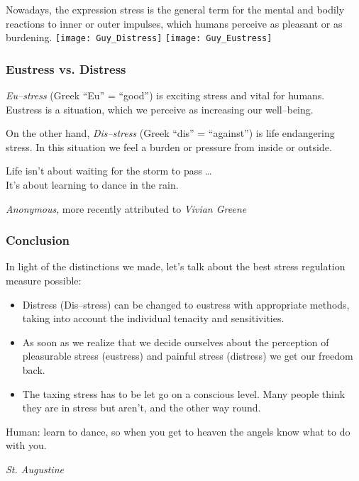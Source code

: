 \documentclass[../main.tex]{subfiles}
\begin{document}
Nowadays, the expression stress is the general term for the mental and bodily reactions to inner or outer impulses, which humans perceive as pleasant or as burdening.
\texttt{[image: Guy\_Distress]}
\hspace{5cm}
\texttt{[image: Guy\_Eustress]}

\subsubsection{Eustress vs. Distress}

\emph{Eu--stress} (Greek ``Eu'' = ``good'') is exciting stress and vital for humans. 
Eustress is a situation, which we perceive as increasing our well--being. 

On the other hand, \emph{Dis--stress} (Greek ``dis'' = ``against'') is life endangering stress. In this situation we feel a burden or pressure from inside or outside.



\epigraph{Life isn't about waiting for the storm to pass \ldots  \\ 
It's about learning to dance in the rain.}{\textit{Anonymous}, more recently attributed to \textit{Vivian Greene}}


\subsubsection{Conclusion}
\noindent In light of the distinctions we made, let's talk about the best stress regulation measure possible:
\begin{itemize}
\item Distress (Dis--stress) can be changed to eustress with appropriate methods, taking into account the individual tenacity and sensitivities.
\item As soon as we realize that we decide ourselves about the perception of pleasurable stress (eustress) and painful stress (distress) we get our freedom back. 
\item The taxing stress has to be let go on a conscious level. Many people think they are in stress but aren't, and the other way round.
\end{itemize}

\epigraph{Human: learn to dance, so when you get to heaven the angels know what to do with you.}{\textit{St. Augustine}}


\end{document}
